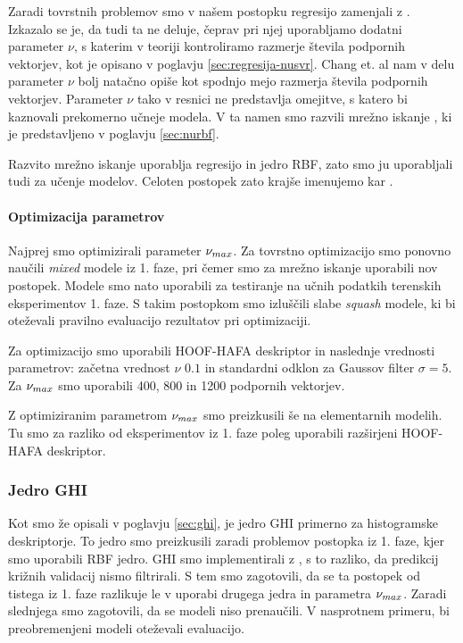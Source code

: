 Zaradi tovrstnih problemov smo v našem postopku regresijo \esvr zamenjali z \nusvr. Izkazalo se je, da tudi ta ne deluje, čeprav pri njej uporabljamo dodatni parameter $\nu$, s katerim v teoriji kontroliramo razmerje števila podpornih vektorjev, kot je opisano v poglavju \ref{sec:regresija-nusvr}. Chang et. al nam v delu \cite{chang2002training} parameter $\nu$ bolj natačno opiše kot spodnjo mejo razmerja števila podpornih vektorjev. Parameter $\nu$ tako v resnici ne predstavlja omejitve, s katero bi kaznovali prekomerno učneje modela. V ta namen smo razvili mrežno iskanje \nurbf, ki je predstavljeno v poglavju \ref{sec:nurbf}. 

Razvito mrežno iskanje \nurbf uporablja regresijo \nusvr in jedro RBF, zato smo ju uporabljali tudi za učenje modelov. Celoten postopek zato krajše imenujemo kar \nurbf.

\paragraph{Optimizacija parametrov}
Najprej smo optimizirali parameter $\nu_{max}$. Za tovrstno optimizacijo smo ponovno naučili \textit{mixed} modele iz 1. faze, pri čemer smo za mrežno iskanje uporabili nov postopek. Modele smo nato uporabili za testiranje na učnih podatkih terenskih eksperimentov 1. faze. S takim postopkom smo izluščili slabe \textit{squash} modele, ki bi oteževali pravilno evaluacijo rezultatov pri optimizaciji.

Za optimizacijo smo uporabili HOOF-HAFA deskriptor in naslednje vrednosti parametrov: začetna vrednost $\nu$ $0.1$ in standardni odklon za Gaussov filter $\sigma=5$. Za $\nu_{max}$ smo uporabili 400, 800 in 1200 podpornih vektorjev. 

Z optimiziranim parametrom $\nu_{max}$ smo \nurbf preizkusili še na elementarnih modelih. Tu smo za razliko od eksperimentov iz 1. faze poleg \nurbf uporabili razširjeni HOOF-HAFA deskriptor.







\subsubsection{Jedro GHI}
Kot smo že opisali v poglavju \ref{sec:ghi}, je jedro GHI primerno za histogramske deskriptorje. To jedro smo preizkusili zaradi problemov postopka iz 1. faze, kjer smo uporabili RBF jedro. GHI smo implementirali z \nurbf, s to razliko, da predikcij križnih validacij nismo filtrirali. S tem smo zagotovili, da se ta postopek od tistega iz 1. faze razlikuje le v uporabi drugega jedra in parametra $\nu_{max}$. Zaradi slednjega smo zagotovili, da se modeli niso prenaučili. V nasprotnem primeru, bi preobremenjeni modeli oteževali evaluacijo.


